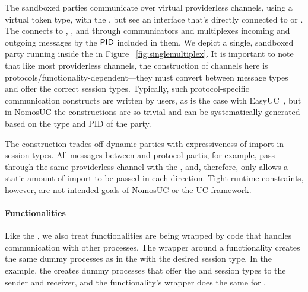 The sandboxed parties communicate over virtual providerless channels, using a virtual token type, with the \partywrapper, but see an interface that's directly connected to \F or \Z. 
The \partywrapper connects to \F, \A, and \Z through communicators and multiplexes incoming and outgoing messages by the $\mathsf{PID}$ included in them. 
We depict a single, sandboxed party running inside the \partywrapper in Figure ~\ref{fig:singlemultiplex}.
It is important to note that like most providerless channels, the construction of channels here is protocols/functionality-dependent---they must convert between message types and offer the correct session types. 
Typically, such protocol-specific communication constructs are written by users, as is the case with EasyUC~\cite{easyuc}, but in NomosUC the constructions are so trivial and can be systematically generated based on the type and PID of the party.


The \partywrapper construction trades off dynamic parties with expressiveness of import in session types.
All messages between \Z and protocol partis, for example, pass through the same providerless channel with the \partywrapper, and, therefore, only allows a static amount of import to be passed in each direction.
Tight runtime constraints, however, are not intended goals of NomosUC or the UC framework.

\paragraph{Functionalities}
Like the \partywrapper, we also treat functionalities are being wrapped by code that handles communication with other processes. The wrapper around a functionality creates the same dummy processes as in the \partywrapper with the desired session type.
In the \Fcom example, the \partywrapper creates dummy processes that offer the  and  session types to the sender and receiver, and the functionality's wrapper does the same for \Fcom. 

